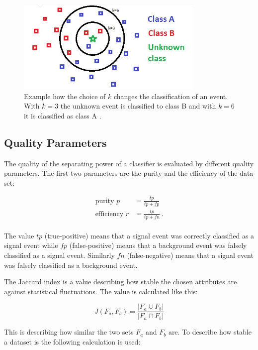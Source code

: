 \begin{figure}
  \centering
  \includegraphics[width=0.8\textwidth]{graphics/knn.png}
  \caption{Example how the choice of $k$ changes the classification of an event. With $k=3$ the unknown event is classified to class B and with $k=6$ it is classified as class A \cite{kNN}.}
  \label{fig:knn}
\end{figure}


\subsection{Quality Parameters}
The quality of the separating power of a classifier is evaluated by different quality parameters.
The first two parameters are the purity and the efficiency of the data set:

\begin{align*}
    \text{purity}\, \, p &= \frac{tp}{tp + fp} \\
    \text{efficiency}\, \, r &= \frac{tp}{tp + fn} \, .\\
\end{align*}

The value $tp$ (true-positive) means that a signal event was correctly classified as a signal event while $fp$ (false-positive) means that a background event was falsely classified as a signal event.
Similarly $fn$ (false-negative) means that a signal event was falsely classified as a background event.

The Jaccard index is a value describing how stable the chosen attributes are against statistical fluctuations.
The value is calculated like this:

\begin{equation*}
    J \left(F_a, F_b \right) = \frac{|F_a \cup F_b|}{|F_a \cap F_b|}
\end{equation*}

This is describing how similar the two sets $F_a$ and $F_b$ are.
To describe how stable a dataset is the following calculation is used:

